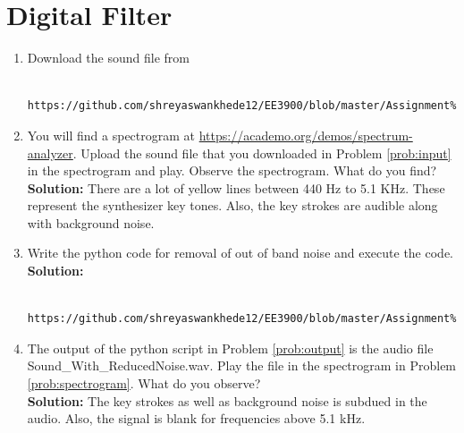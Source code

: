 \documentclass[journal,12pt,twocolumn]{IEEEtran}
\newcommand{\solution}{\noindent \textbf{Solution: }}
\numberwithin{equation}{section}
\renewcommand\thesection{\arabic{section}}
\renewcommand\thesection{\arabic{section}}
\begin{document}
\section{Digital Filter}
\begin{enumerate}[label=\thesection.\arabic*
,ref=\thesection.\theenumi]
\item
\label{prob:input}
Download the sound file from  
\begin{lstlisting}
	https://github.com/shreyaswankhede12/EE3900/blob/master/Assignment%201/sound/Sound_Noise.wav
\end{lstlisting}
\item
\label{prob:spectrogram}
You will find a spectrogram at \href{https://academo.org/demos/spectrum-analyzer}{\url{https://academo.org/demos/spectrum-analyzer}}. 
%
Upload the sound file that you downloaded in Problem \ref{prob:input} in the spectrogram  and play.  Observe the spectrogram. What do you find?
\\
%
\solution There are a lot of yellow lines between 440 Hz to 5.1 KHz.  These represent the synthesizer key tones. Also, the key strokes
are audible along with background noise.
\item
\label{prob:output}
Write the python code for removal of out of band noise and execute the code.
\\
\solution
\begin{lstlisting}
	https://github.com/shreyaswankhede12/EE3900/blob/master/Assignment%201/codes/qs%202/Cancel_noise.py
\end{lstlisting}
% 
%
\item
The output of the python script in Problem \ref{prob:output} is the audio file Sound\_With\_ReducedNoise.wav. Play the file in the spectrogram in Problem \ref{prob:spectrogram}. What do you observe?
\\
\solution The key strokes as well as background noise is subdued in the audio.  Also,  the signal is blank for frequencies above 5.1 kHz.
\end{enumerate}
\end{document}
